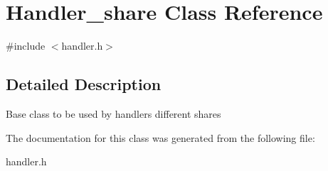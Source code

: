 \hypertarget{classHandler__share}{}\section{Handler\+\_\+share Class Reference}
\label{classHandler__share}


{\ttfamily \#include $<$handler.\+h$>$}



\subsection{Detailed Description}
Base class to be used by handlers different shares 

The documentation for this class was generated from the following file\+:\begin{DoxyCompactItemize}
\item 
handler.\+h\end{DoxyCompactItemize}
